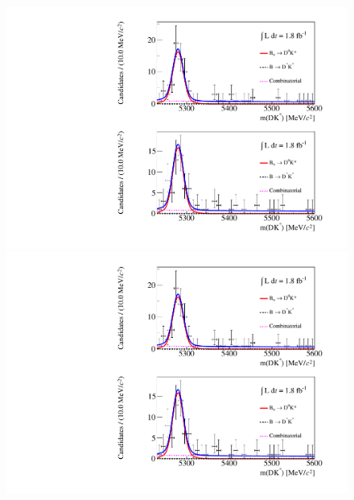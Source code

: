 \begin{figure}
\hfill
{}
\includegraphics[trim = 0 0.5\imageheight{} 0 0,clip,width=0.5\linewidth]{figures/results/canvas_d2kk_DD_run2.pdf}
\includegraphics[trim = 0 0 0 0.5\imageheight{},clip,width=0.5\linewidth]{figures/results/canvas_d2kk_DD_run2.pdf}
\hfill
{}

\end{figure}
